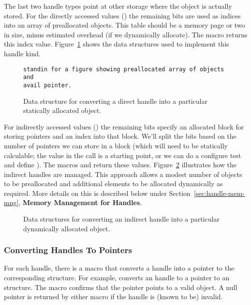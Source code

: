 \documentclass{article}
\begin{document}
The last two handle types point at other storage where the object is
actually stored.
For the directly accessed values () the
remaining bits are used as indices into 
an array of preallocated objects.
This table should be 
a memory page or two in size, 
minus estimated  overhead (if we dynamically allocate).
The macro  returns this index value.
Figure~\ref{fig:handle-direct} shows the data structures used to
implement this handle kind.

\begin{figure}
\begin{verbatim}
standin for a figure showing preallocated array of objects and
avail pointer.
\end{verbatim}
\caption{Data structure for converting a direct handle into a
particular statically allocated object.}
\label{fig:handle-direct}
\end{figure}

For indirectly accessed values () the
remaining bits specify an allocated block 
for storing pointers and an index into that block.  We'll split the bits
based on the number of pointers we can store in a block (which will need
to be statically calculable; the  value in the
 call is a starting point, or we can  do a configure test and
define ). 
The macros  and 
return these values.
Figure~\ref{fig:indirect} illustrates how the indirect handles are managed.
This approach allows a modest number of objects to be preallocated and
additional elements to be allocated dynamically as required.  More
details on this is described below under
Section~\ref{sec:handle-mem-mng}, \textbf{Memory Management for 
Handles}. 

\begin{figure}
\centerline{}
\caption{Data structures for converting an indirect handle into a particular
  dynamically allocated object.}
\label{fig:indirect}
\end{figure}

\subsubsection{Converting Handles To Pointers}
\label{sec:handle-to-ptr}
For each handle, there is a macro  that converts a
handle into a pointer to the corresponding structure.  For example,
 converts an  handle to a
pointer to an
 structure.  The macro  confirms
that the pointer points to a valid object.
A null pointer is returned by either macro if the handle
is (known to be) invalid.
\end{document}
